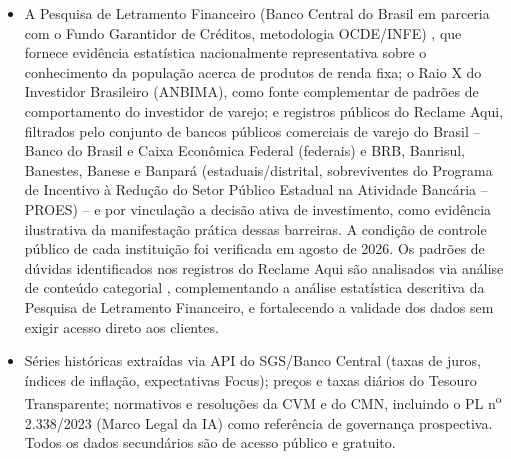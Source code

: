 \begin{itemize}
  \item A Pesquisa de Letramento Financeiro (Banco Central do Brasil em
  parceria com o Fundo Garantidor de Cr\'editos, metodologia OCDE/INFE)
  \autocite{bcbfgc2023}, que fornece evid\^encia estat\'istica
  nacionalmente representativa sobre o conhecimento da popula\c{c}\~ao
  acerca de produtos de renda fixa; o Raio X do Investidor Brasileiro
  (ANBIMA), como fonte complementar de padr\~oes de comportamento do
  investidor de varejo; e registros p\'ublicos do Reclame Aqui, filtrados
  pelo conjunto de bancos p\'ublicos comerciais de varejo do Brasil --
  Banco do Brasil e Caixa Econ\^omica Federal (federais) e BRB, Banrisul,
  Banestes, Banese e Banpar\'a (estaduais/distrital, sobreviventes do
  Programa de Incentivo \`a Redu\c{c}\~ao do Setor P\'ublico Estadual na
  Atividade Banc\'aria -- PROES) -- e por vincula\c{c}\~ao a decis\~ao
  ativa de investimento, como evid\^encia ilustrativa da manifesta\c{c}\~ao
  pr\'atica dessas barreiras. A condi\c{c}\~ao de controle p\'ublico de
  cada institui\c{c}\~ao foi verificada em agosto de 2026. Os padr\~oes de
  d\'uvidas identificados nos registros do Reclame Aqui s\~ao analisados
  via an\'alise de conte\'udo categorial \autocite{bardin2011},
  complementando a an\'alise estat\'istica descritiva da Pesquisa de
  Letramento Financeiro, e fortalecendo a validade dos dados sem exigir
  acesso direto aos clientes.

  \item S\'eries hist\'oricas extra\'idas via API do SGS/Banco Central
  (taxas de juros, \'indices de infla\c{c}\~ao, expectativas Focus);
  pre\c{c}os e taxas di\'arios do Tesouro Transparente; normativos e resolu\c{c}\~oes da CVM e do CMN, incluindo o
  PL n\textsuperscript{o} 2.338/2023 (Marco Legal da IA) como refer\^encia
  de governan\c{c}a prospectiva. Todos os dados secund\'arios s\~ao de
  acesso p\'ublico e gratuito.
\end{itemize}

